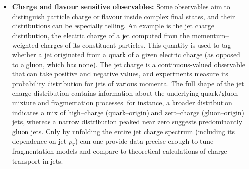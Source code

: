 \begin{itemize}
            Unfolding these jet substructure distributions in an unbinned way provides a high resolution view of QCD dynamics and is increasingly necessary as theory tools\footnote{like analytic resummation or first principles simulation} improve to the point of predicting differential shapes.
            In fact, recent measurements have demonstrated the power of full phase space unfolding for jets, using multivariate ML techniques to correct detector effects and obtain particle level jet observable spectra without binning.
            These cases underscore that jet physics benefits enormously from preserving the full shape information.
        \item \textbf{Charge and flavour sensitive observables:}
            Some observables aim to distinguish particle charge or flavour inside complex final states, and their distributions can be especially telling.
            An example is the jet charge distribution, the electric charge of a jet computed from the momentum--weighted charges of its constituent particles.
            This quantity is used to tag whether a jet originated from a quark of a given electric charge (as opposed to a gluon, which has none).
            The jet charge is a continuous-valued observable that can take positive and negative values, and experiments measure its probability distribution for jets of various momenta.
            The full shape of the jet charge distribution contains information about the underlying quark/gluon mixture and fragmentation processes;
            for instance, a broader distribution indicates a mix of high--charge (quark--origin) and zero--charge (gluon--origin) jets, whereas a narrow distribution peaked near zero suggests predominantly gluon jets.
            Only by unfolding the entire jet charge spectrum (including its dependence on jet $p_T$) can one provide data precise enough to tune fragmentation models and compare to theoretical calculations of charge transport in jets.
            

\end{itemize}
